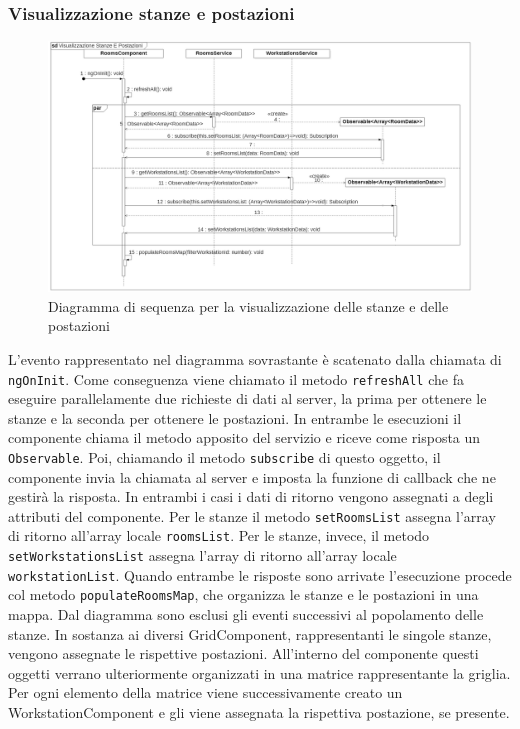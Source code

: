 \subsubsection{Visualizzazione stanze e postazioni}
\begin{figure}[H]
	\centering
	\includegraphics[width=18cm]{res/images/webapp-visualStanzePostazioni-diagrammaSequenza.png}
	\caption{Diagramma di sequenza per la visualizzazione delle stanze e delle postazioni}
	\label{fig:DiagrammaSequenzaStanzePostazioni1}
\end{figure}
L'evento rappresentato nel diagramma sovrastante è scatenato dalla chiamata di \texttt{ngOnInit}. Come conseguenza viene chiamato il metodo \texttt{refreshAll} che fa eseguire parallelamente due richieste di dati al server, la prima per ottenere le stanze e la seconda per ottenere le postazioni. In entrambe le esecuzioni il componente chiama il metodo apposito del servizio e riceve come risposta un \texttt{Observable}. Poi, chiamando il metodo \texttt{subscribe} di questo oggetto, il componente invia la chiamata al server e imposta la funzione di callback che ne gestirà la risposta. In entrambi i casi i dati di ritorno vengono assegnati a degli attributi del componente. Per le stanze il metodo \texttt{setRoomsList} assegna l'array di ritorno all'array locale \texttt{roomsList}. Per le stanze, invece, il metodo \texttt{setWorkstationsList} assegna l'array di ritorno all'array locale \texttt{workstationList}. Quando entrambe le risposte sono arrivate l'esecuzione procede col metodo \texttt{populateRoomsMap}, che organizza le stanze e le postazioni in una mappa.
Dal diagramma sono esclusi gli eventi successivi al popolamento delle stanze. In sostanza ai diversi GridComponent, rappresentanti le singole stanze, vengono assegnate le rispettive postazioni. All'interno del componente questi oggetti verrano ulteriormente organizzati in una matrice rappresentante la griglia. Per ogni elemento della matrice viene successivamente creato un WorkstationComponent e gli viene assegnata la rispettiva postazione, se presente.


